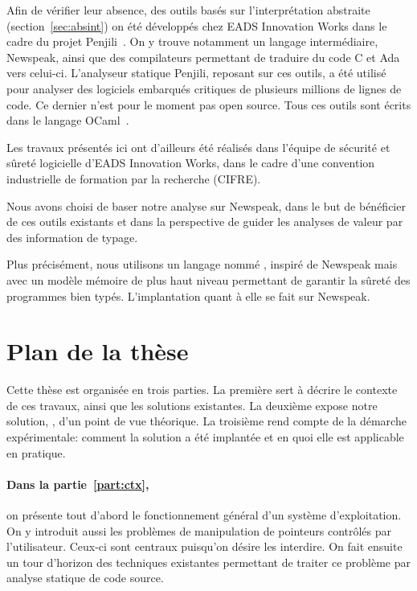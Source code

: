 Afin de vérifier leur absence, des outils basés sur l'interprétation abstraite
(section~\ref{sec:absint}) on été développés chez EADS Innovation Works dans le
cadre du projet Penjili~. On y trouve notamment un langage
intermédiaire, Newspeak\cite{newspeak}, ainsi que des compilateurs permettant de
traduire du code C et Ada vers celui-ci. L'analyseur statique Penjili, reposant
sur ces outils, a été utilisé pour analyser des logiciels embarqués critiques de
plusieurs millions de lignes de code. Ce dernier n'est pour le moment pas open
source. Tous ces outils sont écrits dans le langage OCaml~\cite{DAOC}.

Les travaux présentés ici ont d'ailleurs été réalisés dans l'équipe de sécurité
et sûreté logicielle d'EADS Innovation Works, dans le cadre d'une convention
industrielle de formation par la recherche (CIFRE).

Nous avons choisi de baser notre analyse sur Newspeak, dans le but de bénéficier
de ces outils existants et dans la perspective de guider les analyses de valeur
par des information de typage.

Plus précisément, nous utilisons un langage nommé \langname, inspiré de Newspeak
mais avec un modèle mémoire de plus haut niveau permettant de garantir la sûreté
des programmes bien typés. L'implantation quant à elle se fait sur Newspeak.

\section{Plan de la thèse}

Cette thèse est organisée en trois parties. La première sert à décrire le
contexte de ces travaux, ainsi que les solutions existantes. La deuxième expose
notre solution, \langname, d'un point de vue théorique. La troisième rend compte
de la démarche expérimentale: comment la solution a été implantée et en quoi
elle est applicable en pratique.

\paragraph{Dans la partie~\ref{part:ctx},} on présente tout d'abord le
fonctionnement général d'un système d'exploitation. On y introduit aussi les
problèmes de manipulation de pointeurs contrôlés par l'utilisateur. Ceux-ci sont
centraux puisqu'on désire les interdire. On fait ensuite un tour d'horizon des
techniques existantes permettant de traiter ce problème par analyse statique de
code source.

